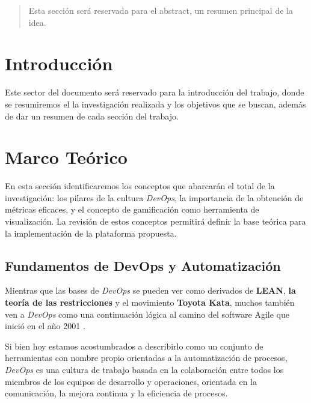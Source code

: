 \documentclass[journal]{IEEEtran}
\begin{document}
\begin{abstract}
    Esta sección será reservada para el abstract, un resumen principal de la idea.
\end{abstract}

\section{\textbf{\Large Introducción}}
Este sector del documento será reservado para la introducción del trabajo, donde se resumiremos el la investigación realizada y los objetivos que se buscan, además de dar un resumen de cada sección del trabajo.

\section{\textbf{\Large Marco Teórico}}

En esta sección identificaremos los conceptos que abarcarán el total de la investigación: los pilares de la cultura \textit{DevOps}, la importancia de la obtención de métricas eficaces, y el concepto de gamificación como herramienta de visualización. La revisión de estos conceptos permitirá definir la base teórica para la implementación de la plataforma propuesta.

\subsection{\textbf{Fundamentos de DevOps y Automatización}} \label{fundamentos-devops}

\begin{tcolorbox}[colback=gray!10, colframe=black, left=2mm, right=2mm]
    \small %
    \ttfamily %
    \raggedright %
    Mientras que las bases de \textit{DevOps} se pueden ver como derivados de \textbf{LEAN}, \textbf{la teoría de las restricciones} y el movimiento \textbf{Toyota Kata}, muchos también ven a \textit{DevOps} como una continuación lógica al camino del software Agile que inició en el año 2001 \cite{kim2021devops}.
\end{tcolorbox}

Si bien hoy estamos acostumbrados a describirlo como un conjunto de herramientas con nombre propio orientadas a la automatización de procesos, \textit{DevOps} es una cultura de trabajo basada en la colaboración entre todos los miembros de los equipos de desarrollo y operaciones, orientada en la comunicación, la mejora continua y la eficiencia de procesos.
\end{document}
